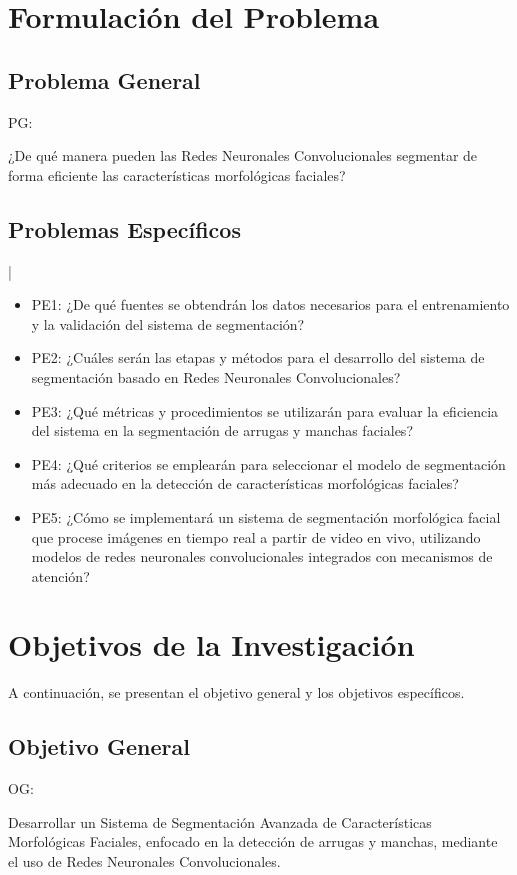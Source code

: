 \section{Formulación del Problema}

\subsection{Problema General}
PG: \newcommand{\ProblemaGeneral}{
¿De qué manera pueden las Redes Neuronales Convolucionales segmentar de forma eficiente las características morfológicas faciales?
}
\ProblemaGeneral
\subsection{Problemas Específicos}
\newcommand{\Pbone}{
¿De qué fuentes se obtendrán los datos necesarios para el entrenamiento y la validación del sistema de segmentación?
}
\newcommand{\Pbtwo}{
¿Cuáles serán las etapas y métodos para el desarrollo del sistema de segmentación basado en Redes Neuronales Convolucionales?
}
\newcommand{\Pbthree}{
¿Qué métricas y procedimientos se utilizarán para evaluar la eficiencia del sistema en la segmentación de arrugas y manchas faciales?
}
|
\newcommand{\Pbfour}{
¿Qué criterios se emplearán para seleccionar el modelo de segmentación más adecuado en la detección de características morfológicas faciales?
}

\newcommand{\Pbfive}{
¿Cómo se implementará un sistema de segmentación morfológica facial que procese imágenes en tiempo real a partir de video en vivo, utilizando modelos de redes neuronales convolucionales integrados con mecanismos de atención?
}


\begin{itemize}
	\item PE1: {\Pbone}
	\item PE2: {\Pbtwo}
	\item PE3: {\Pbthree}
	\item PE4: {\Pbfour}
	\item PE5: {\Pbfive}
\end{itemize}

\section{Objetivos de la Investigación}
A continuación, se presentan el objetivo general y los objetivos específicos.
\subsection{Objetivo General}
OG: \newcommand{\ObjetivoGeneral}{
Desarrollar un Sistema de Segmentación Avanzada de Características Morfológicas Faciales, enfocado en la detección de arrugas y manchas, mediante el uso de Redes Neuronales Convolucionales.
}
\ObjetivoGeneral
